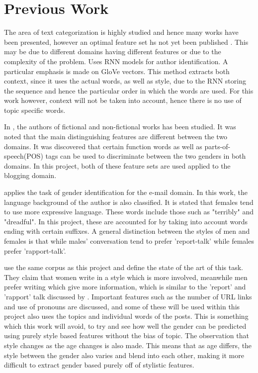\section{Previous Work}
The area of text categorization is highly studied and hence many works have been presented, however an optimal feature set hs not yet been published \cite{1}. This may be due to different domains having different features or due to the complexity of the problem. \cite{1} Uses RNN models for author identification. A particular emphasis is made on GloVe vectors. This method extracts both context, since it uses the actual words, as well as style, due to the RNN storing the sequence and hence the particular order in which the words are used. For this work however, context will not be taken into account, hence there is no use of topic specific words.

In \cite{3}, the authors of fictional and non-fictional works has been studied. It was noted that the main distinguishing features are different between the two domains. It was discovered that certain function words as well as parts-of-speech(POS) tags can be used to discriminate between the two genders in both domains. In this project, both of these feature sets are used applied to the blogging domain.

\cite{4} applies the task of gender identification for the e-mail domain. In this work, the language background of the author is also classified. It is stated that females tend to use more expressive language. These words include those such as "terribly" and "dreadful". In this project, these are accounted for by taking into account words ending with certain suffixes. A general distinction between the styles of men and females is that while males' conversation tend to prefer 'report-talk' while females prefer 'rapport-talk'.

\cite{2} use the same corpus as this project and define the state of the art of this task. They claim that women write in a style which is more involved, meanwhile men prefer writing which give more information, which is similar to the 'report' and 'rapport' talk discussed by \cite{4}. Important features such as the number of URL links and use of pronouns are discussed, and some of these will be used within this project \cite{2} also uses the topics and individual words of the posts. This is something which this work will avoid, to try and see how well the gender can be predicted using purely style based features without the bias of topic. The observation that style changes as the age changes is also made. This means that as age differs, the style between the gender also varies and blend into each other, making it more difficult to extract gender based purely off of stylistic features.
